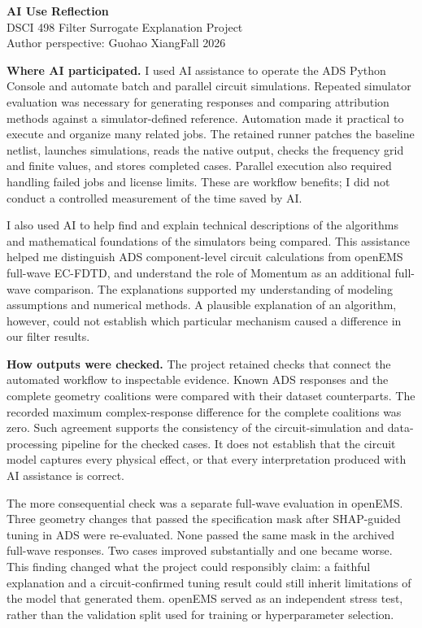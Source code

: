 \documentclass[11pt,letterpaper]{article}
\begin{document}
\begin{center}
{\Large\bfseries AI Use Reflection}\\[5pt]
DSCI 498 Filter Surrogate Explanation Project\\
Author perspective: Guohao Xiang\quad Fall 2026
\end{center}

\textbf{Where AI participated.}
I used AI assistance to operate the ADS Python Console and automate batch and parallel circuit simulations. Repeated simulator evaluation was necessary for generating responses and comparing attribution methods against a simulator-defined reference. Automation made it practical to execute and organize many related jobs. The retained runner patches the baseline netlist, launches simulations, reads the native output, checks the frequency grid and finite values, and stores completed cases. Parallel execution also required handling failed jobs and license limits. These are workflow benefits; I did not conduct a controlled measurement of the time saved by AI.

I also used AI to help find and explain technical descriptions of the algorithms and mathematical foundations of the simulators being compared. This assistance helped me distinguish ADS component-level circuit calculations from openEMS full-wave EC-FDTD, and understand the role of Momentum as an additional full-wave comparison. The explanations supported my understanding of modeling assumptions and numerical methods. A plausible explanation of an algorithm, however, could not establish which particular mechanism caused a difference in our filter results.

\textbf{How outputs were checked.}
The project retained checks that connect the automated workflow to inspectable evidence. Known ADS responses and the complete geometry coalitions were compared with their dataset counterparts. The recorded maximum complex-response difference for the complete coalitions was zero. Such agreement supports the consistency of the circuit-simulation and data-processing pipeline for the checked cases. It does not establish that the circuit model captures every physical effect, or that every interpretation produced with AI assistance is correct.

The more consequential check was a separate full-wave evaluation in openEMS. Three geometry changes that passed the specification mask after SHAP-guided tuning in ADS were re-evaluated. None passed the same mask in the archived full-wave responses. Two cases improved substantially and one became worse. This finding changed what the project could responsibly claim: a faithful explanation and a circuit-confirmed tuning result could still inherit limitations of the model that generated them. openEMS served as an independent stress test, rather than the validation split used for training or hyperparameter selection.
\end{document}
